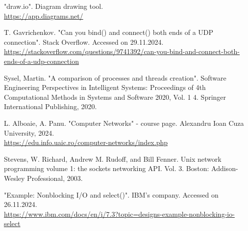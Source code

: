 \documentclass[runningheads]{llncs}
\begin{document}

\begin{thebibliography}{8}

 "draw.io". Diagram drawing tool. \\ \url{https://app.diagrams.net/}

T. Gavrichenkov. "Can you bind() and connect() both ends of a UDP connection". Stack Overflow. Accessed on 29.11.2024. \\
\url{https://stackoverflow.com/questions/9741392/can-you-bind-and-connect-both-ends-of-a-udp-connection}

 Sysel, Martin. "A comparison of processes and threads creation". Software Engineering Perspectives in Intelligent Systems: Proceedings of 4th Computational Methods in Systems and Software 2020, Vol. 1 4. Springer International Publishing, 2020. \\ 

L. Alboaie, A. Panu. "Computer Networks" - course page. Alexandru Ioan Cuza University, 2024. \\
\url{https://edu.info.uaic.ro/computer-networks/index.php}

 Stevens, W. Richard, Andrew M. Rudoff, and Bill Fenner. Unix network programming volume 1: the sockets networking API. Vol. 3. Boston: Addison-Wesley Professional, 2003.

 "Example: Nonblocking I/O and select()". IBM's company. Accessed on 26.11.2024. \\
\url{https://www.ibm.com/docs/en/i/7.3?topic=designs-example-nonblocking-io-select}

\end{thebibliography}
\end{document}
